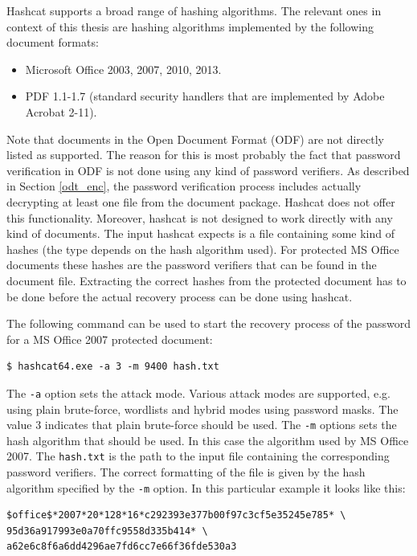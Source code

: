 \documentclass[11pt,oneside]{fithesis2}
\begin{document}
Hashcat supports a broad range of hashing algorithms. The relevant ones in context of this thesis are hashing algorithms implemented by the following document formats: 

\begin{itemize}
\setlength\itemsep{0.1em}
	\item{Microsoft Office 2003, 2007, 2010, 2013.}
	\item{PDF 1.1-1.7 (standard security handlers that are implemented by Adobe Acrobat 2-11).}	
\end{itemize}

Note that documents  in the Open Document Format (ODF) are not directly listed as supported. The reason for this is most probably the fact that password verification in ODF is not done using any kind of password verifiers. As described in Section \ref{odt_enc}, the password verification process includes actually decrypting at least one file from the document package. Hashcat does not offer this functionality. Moreover, hashcat is not designed to work directly with any kind of documents. The input hashcat expects is a file containing some kind of hashes (the type depends on the hash algorithm used). For protected MS Office documents these hashes are the password verifiers that can be found in the document file. Extracting the correct hashes from the protected document has to be done before the actual recovery process can be done using hashcat.

The following command can be used to start the recovery process of the password for a MS Office 2007 protected document:

\begin{lstlisting}
$ hashcat64.exe -a 3 -m 9400 hash.txt
\end{lstlisting}

The \texttt{-a} option sets the attack mode. Various attack modes are supported, e.g. using plain brute-force, wordlists and hybrid modes using password masks. The value 3 indicates that plain brute-force should be used. The \texttt{-m} options sets the hash algorithm that should be used. In this case the algorithm used by MS Office 2007. The \texttt{hash.txt} is the path to the input file containing the corresponding password verifiers. The correct formatting of the file is given by the hash algorithm specified by the \texttt{-m} option. In this particular example it looks like this:

\begin{lstlisting}
$office$*2007*20*128*16*c292393e377b00f97c3cf5e35245e785* \
95d36a917993e0a70ffc9558d335b414* \
a62e6c8f6a6dd4296ae7fd6cc7e66f36fde530a3
\end{lstlisting}
\end{document}
